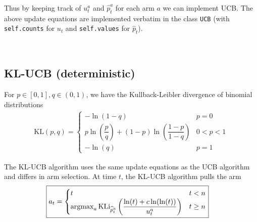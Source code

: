 Thus by keeping track of $u_t^a$ and $\hat{p}_t^a$ for each arm $a$ we can implement UCB. The above update equations are implemented verbatim in the class \lstinline{UCB} (with \lstinline{self.counts} for $u_t$ and \lstinline{self.values} for $\hat{p}_t$).

\begin{figure}[h]
    \caption{Regret vs Horizon (note the different y-axis scales)}
    \begin{subfigure}[b]{0.5\textwidth}
        \centering
        
    \end{subfigure}
    \begin{subfigure}[b]{0.5\textwidth}
        \centering
        
    \end{subfigure} \\
    \begin{subfigure}[b]{0.5\textwidth}
        \centering
        
    \end{subfigure}
    \begin{subfigure}[b]{0.5\textwidth}
        \centering
        
    \end{subfigure}
\end{figure}

\subsection{KL-UCB (deterministic)}
For $p\in[0,1], q\in(0,1)$, we have the Kullback-Leibler divergence of binomial distributions
\begin{align*}
    \text{KL}(p, q) = \begin{cases}
        -\ln(1 - q) & p = 0 \\
        p\ln(\dfrac{p}{q}) + (1 - p)\ln(\dfrac{1 - p}{1 - q}) & 0 < p < 1 \\
        -\ln(q) & p = 1
    \end{cases}
\end{align*}

The KL-UCB algorithm uses the same update equations as the UCB algorithm and differs in arm selection. At time $t$, the KL-UCB algorithm pulls the arm
\begin{align*}
    \Aboxed{a_t = {\begin{cases}
        t & t < n \\
        \argmax_{a} \text{KLi}_{\hat{p}_t^a}\left(\dfrac{\ln(t) + c\ln(\ln(t))}{u_t^a}\right) & t \geq n
    \end{cases}}}
\end{align*}

